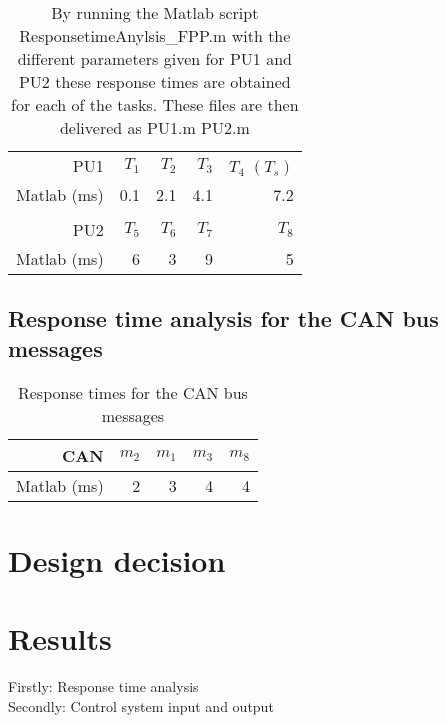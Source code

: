 \begin{table}[htbp]
	\centering
	\caption{By running the Matlab script ResponsetimeAnylsis\_FPP.m with the different parameters given for PU1 and PU2 these response times are obtained for each of the tasks. These files are then delivered as PU1.m PU2.m}
	\begin{tabular}{rrrrr}
		& & & & \\
		\toprule
		PU1     & $T_1$    & $T_2$    & $T_3$    & $T_4$  $(T_s)$ \\
		\midrule
		Matlab (ms)      & 0.1     & 2.1     & 4.1     & 7.2 \\
		
		& & & & \\
		\toprule
		PU2     & $T_5$    & $T_6$    & $T_7$    & $T_8$ \\
		\midrule
			Matlab (ms)      & 6       & 3       & 9       & 5 \\
		
	\end{tabular}%
	\label{tab:pu-rt}%
\end{table}%



\subsection{ Response time analysis for the CAN bus messages}

\begin{table}[htbp]
	\centering
	\caption{Response times for the CAN bus messages}
	\begin{tabular}{rrrrr}
		\toprule
		CAN     & $m_2$   & $m_1$   & $m_3$   & $m_8$ \\
		\midrule
		Matlab (ms) & 2       & 3       & 4       & 4 \\
		
	\end{tabular}%
	\label{tab:can-rt}%
\end{table}%




\section{Design decision}

\section{Results}
Firstly: Response time analysis\\
Secondly: Control system input and output










